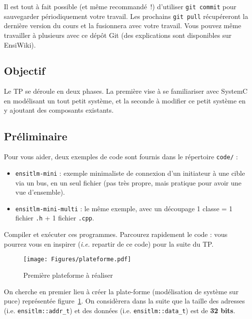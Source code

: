 \documentclass[12pt,a4paper]{article}
\begin{document}
Il est tout à fait possible (et même recommandé~!) d'utiliser \texttt{git commit} pour sauvegarder périodiquement votre travail.
Les prochains \texttt{git pull} récupéreront la dernière version du cours et la fusionnera avec votre travail.
Vous pouvez même travailler à plusieurs avec ce dépôt Git (des explications sont disponibles sur EnsiWiki).


\subsection*{Objectif}

Le TP se déroule en deux phases.
La première vise à se familiariser avec SystemC en modélisant un tout petit système, et la seconde à modifier ce petit système en y ajoutant des composants existants.

\subsection*{Préliminaire}

Pour vous aider, deux exemples de code sont fournis dans le répertoire
\texttt{code/} :

\begin{itemize}
\item \texttt{ensitlm-mini} : exemple minimaliste de connexion d'un initiateur à une cible via un bus, en un seul fichier (pas très propre, mais pratique pour avoir une vue d'ensemble).
\item \texttt{ensitlm-mini-multi} : le même exemple, avec un découpage 1 classe = 1 fichier \texttt{.h} + 1 fichier \texttt{.cpp}.
\end{itemize}

Compiler et exécuter ces programmes.
Parcourez rapidement le code : vous pourrez vous en inspirer (\emph{i.e.} repartir de ce code) pour la suite du TP.

\begin{figure}
   \begin{center}
      \texttt{[image: Figures/plateforme.pdf]}
   \end{center}
   \caption{Première plateforme à réaliser}
   \label{figPlateforme}
\end{figure}

On cherche en premier lieu à créer la plate-forme (modélisation de système sur puce) représentée figure~\ref{figPlateforme}.
On considèrera dans la suite que la taille des adresses (i.e. \lstinline|ensitlm::addr_t|) et des données (i.e. \lstinline|ensitlm::data_t|) est de \textbf{32 bits}.
\end{document}

